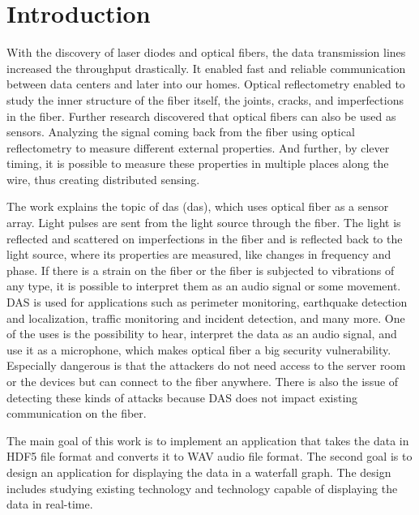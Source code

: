 \chapter*{Introduction}
{}

With the discovery of laser diodes and optical fibers, the data transmission lines increased the throughput drastically. It enabled fast and reliable communication between data centers and later into our homes. Optical reflectometry enabled to study the inner structure of the fiber itself, the joints, cracks, and imperfections in the fiber. Further research discovered that optical fibers can also be used as sensors. Analyzing the signal coming back from the fiber using optical reflectometry to measure different external properties. And further, by clever timing, it is possible to measure these properties in multiple places along the wire, thus creating distributed sensing.

The work explains the topic of \acs{das} (\acl{das}), which uses optical fiber as a sensor array. Light pulses are sent from the light source through the fiber. The light is reflected and scattered on imperfections in the fiber and is reflected back to the light source, where its properties are measured, like changes in frequency and phase. If there is a strain on the fiber or the fiber is subjected to vibrations of any type, it is possible to interpret them as an audio signal or some movement. DAS is used for applications such as perimeter monitoring, earthquake detection and localization, traffic monitoring and incident detection, and many more. One of the uses is the possibility to hear, interpret the data as an audio signal, and use it as a microphone, which makes optical fiber a big security vulnerability. Especially dangerous is that the attackers do not need access to the server room or the devices but can connect to the fiber anywhere. There is also the issue of detecting these kinds of attacks because DAS does not impact existing communication on the fiber.

The main goal of this work is to implement an application that takes the data in HDF5 file format and converts it to WAV audio file format. The second goal is to design an application for displaying the data in a waterfall graph. The design includes studying existing technology and technology capable of displaying the data in real-time.


